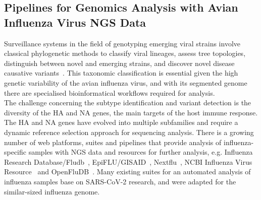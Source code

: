 \subsection{Pipelines for Genomics Analysis with Avian Influenza Virus NGS Data}
Surveillance systems in the field of genotyping emerging viral strains involve classical phylogenetic methods to classify viral lineages, assess tree topologies, distinguish between novel and emerging strains, and discover novel disease causative variants~\cite{koboldt2013next}. This taxonomic classification is essential given the high genetic variability of the avian influenza virus, and with its segmented genome there are specialised bioinformatical workflows required for analysis. \\
The challenge concerning the subtype identification and variant detection is the diversity of the HA and NA genes, the main targets of the host immune response. The HA and NA genes have evolved into multiple subfamilies and require a dynamic reference selection approach for sequencing analysis. There is a growing number of web platforms, suites and pipelines that provide analysis of influenza-specific samples with NGS data and resources for further analysis, e.g. Influenza Research Database/Fludb~\cite{zhang2017influenza}, EpiFLU/GISAID~\cite{shu2017gisaid}, Nextflu~\cite{neher2015nextflu}, NCBI Influenza Virus Resource~\cite{bao2008influenza} and OpenFluDB~\cite{liechti2010openfludb}. Many existing suites for an automated analysis of influenza samples base on SARS-CoV-2 research, and were adapted for the similar-sized influenza genome.

